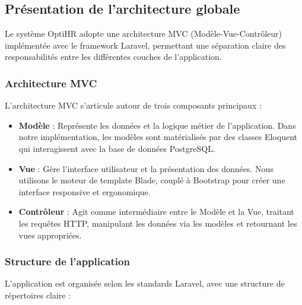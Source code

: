 \subsection{Présentation de l'architecture globale}

Le système OptiHR adopte une architecture MVC (Modèle-Vue-Contrôleur) implémentée avec le framework Laravel, permettant une séparation claire des responsabilités entre les différentes couches de l'application.

\subsubsection{Architecture MVC}
L'architecture MVC s'articule autour de trois composants principaux :

\begin{itemize}
    \item \textbf{Modèle} : Représente les données et la logique métier de l'application. Dans notre implémentation, les modèles sont matérialisés par des classes Eloquent qui interagissent avec la base de données PostgreSQL.
    
    \item \textbf{Vue} : Gère l'interface utilisateur et la présentation des données. Nous utilisons le moteur de template Blade, couplé à Bootstrap pour créer une interface responsive et ergonomique.
    
    \item \textbf{Contrôleur} : Agit comme intermédiaire entre le Modèle et la Vue, traitant les requêtes HTTP, manipulant les données via les modèles et retournant les vues appropriées.
\end{itemize}

\subsubsection{Structure de l'application}
L'application est organisée selon les standards Laravel, avec une structure de répertoires claire :

